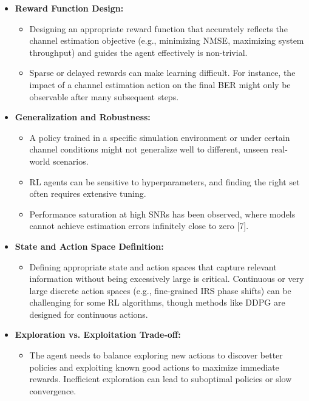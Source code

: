 \documentclass[journal,twocolumn]{IEEEtran}
\begin{document}
\begin{itemize}
\begin{itemize}
        \end{itemize}
    \item \textbf{Reward Function Design:}
        \begin{itemize}
            \item Designing an appropriate reward function that accurately reflects the channel estimation objective (e.g., minimizing NMSE, maximizing system throughput) and guides the agent effectively is non-trivial.
            \item Sparse or delayed rewards can make learning difficult. For instance, the impact of a channel estimation action on the final BER might only be observable after many subsequent steps.
        \end{itemize}
    \item \textbf{Generalization and Robustness:}
        \begin{itemize}
            \item A policy trained in a specific simulation environment or under certain channel conditions might not generalize well to different, unseen real-world scenarios.
            \item RL agents can be sensitive to hyperparameters, and finding the right set often requires extensive tuning.
            \item Performance saturation at high SNRs has been observed, where models cannot achieve estimation errors infinitely close to zero [7].
        \end{itemize}
    \item \textbf{State and Action Space Definition:}
        \begin{itemize}
            \item Defining appropriate state and action spaces that capture relevant information without being excessively large is critical. Continuous or very large discrete action spaces (e.g., fine-grained IRS phase shifts) can be challenging for some RL algorithms, though methods like DDPG are designed for continuous actions.
        \end{itemize}
    \item \textbf{Exploration vs. Exploitation Trade-off:}
        \begin{itemize}
            \item The agent needs to balance exploring new actions to discover better policies and exploiting known good actions to maximize immediate rewards. Inefficient exploration can lead to suboptimal policies or slow convergence.
        \end{itemize}

\end{itemize}
\end{document}
